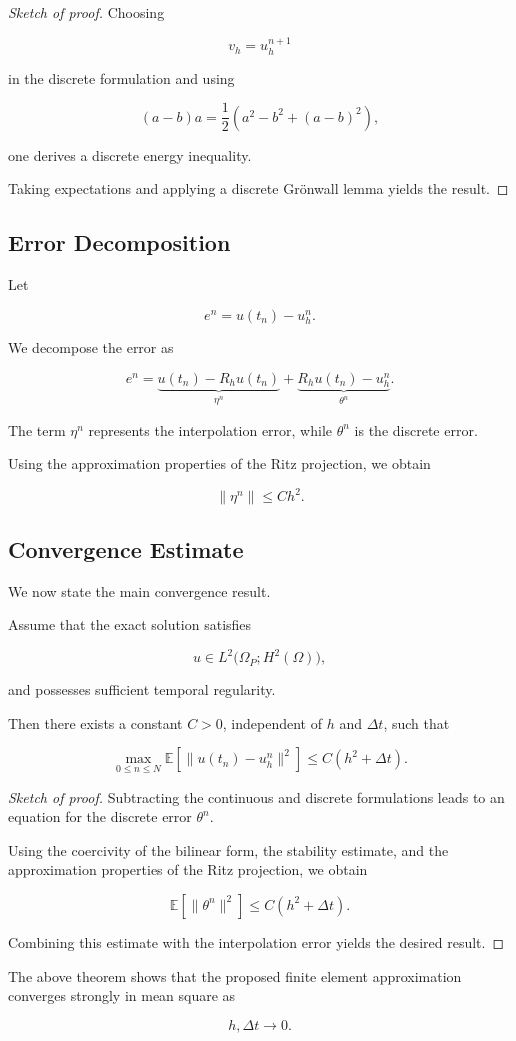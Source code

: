 \begin{proof}[Sketch of proof]

Choosing

\[
v_h=u_h^{n+1}
\]

in the discrete formulation and using

\[
(a-b)a
=
\frac12
\left(
a^2-b^2+(a-b)^2
\right),
\]

one derives a discrete energy inequality.

Taking expectations and applying a discrete Grönwall lemma yields the result.

\end{proof}

\subsection{Error Decomposition}

Let

\[
e^n
=
u(t_n)-u_h^n.
\]

We decompose the error as

\[
e^n
=
\underbrace{u(t_n)-R_hu(t_n)}_{\eta^n}
+
\underbrace{R_hu(t_n)-u_h^n}_{\theta^n}.
\]

The term $\eta^n$ represents the interpolation error, while $\theta^n$ is the discrete error.

Using the approximation properties of the Ritz projection, we obtain

\[
\|\eta^n\|
\le
Ch^2.
\]

\subsection{Convergence Estimate}

We now state the main convergence result.

\begin{theorem}
Assume that the exact solution satisfies

\[
u
\in
L^2
\bigl(
\Omega_P;
H^2(\Omega)
\bigr),
\]

and possesses sufficient temporal regularity.

Then there exists a constant $C>0$, independent of $h$ and $\Delta t$, such that

\[
\max_{0\le n\le N}
\mathbb E
\left[
\|u(t_n)-u_h^n\|^2
\right]
\le
C
\left(
h^2+\Delta t
\right).
\]

\end{theorem}

\begin{proof}[Sketch of proof]

Subtracting the continuous and discrete formulations leads to an equation for the discrete error $\theta^n$.

Using the coercivity of the bilinear form, the stability estimate, and the approximation properties of the Ritz projection, we obtain

\[
\mathbb E
\left[
\|\theta^n\|^2
\right]
\le
C
\left(
h^2+\Delta t
\right).
\]

Combining this estimate with the interpolation error yields the desired result.

\end{proof}

The above theorem shows that the proposed finite element approximation converges strongly in mean square as

\[
h,\Delta t \rightarrow 0.
\]